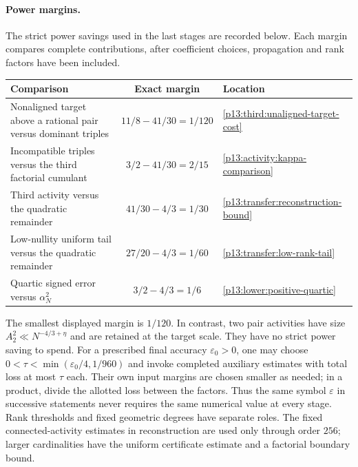 \paragraph{Power margins.}
The strict power savings used in the last stages are recorded below.
Each margin compares complete contributions, after coefficient choices,
propagation and rank factors have been included.
\begin{center}
\small
\begin{tabularx}{\textwidth}{@{}Xcl@{}}
\toprule
Comparison & Exact margin & Location\\
\midrule
Nonaligned target above a rational pair versus dominant triples
& $11/8-41/30=1/120$
& \eqref{p13:third:unaligned-target-cost}\\[4pt]
Incompatible triples versus the third factorial cumulant
& $3/2-41/30=2/15$
& \eqref{p13:activity:kappa-comparison}\\[4pt]
Third activity versus the quadratic remainder
& $41/30-4/3=1/30$
& \eqref{p13:transfer:reconstruction-bound}\\[4pt]
Low-nullity uniform tail versus the quadratic remainder
& $27/20-4/3=1/60$
& \eqref{p13:transfer:low-rank-tail}\\[4pt]
Quartic signed error versus $\alpha_N^2$
& $3/2-4/3=1/6$
& \eqref{p13:lower:positive-quartic}\\
\bottomrule
\end{tabularx}
\end{center}
The smallest displayed margin is $1/120$. In contrast, two pair
activities have size $A_2^2\ll N^{-4/3+\eta}$ and are retained at
the target scale. They have no strict power saving to spend.
For a prescribed final accuracy $\varepsilon_0>0$, one may choose
$0<\tau<\min(\varepsilon_0/4,1/960)$ and invoke completed auxiliary
estimates with total loss at most $\tau$ each. Their own input margins
are chosen smaller as needed; in a product, divide the allotted loss
between the factors. Thus the same symbol $\varepsilon$ in successive
statements never requires the same numerical value at every stage.
Rank thresholds and fixed geometric degrees have separate roles.
The fixed connected-activity estimates in reconstruction are used only
through order $256$; larger cardinalities have the uniform certificate estimate and a factorial
boundary bound.

